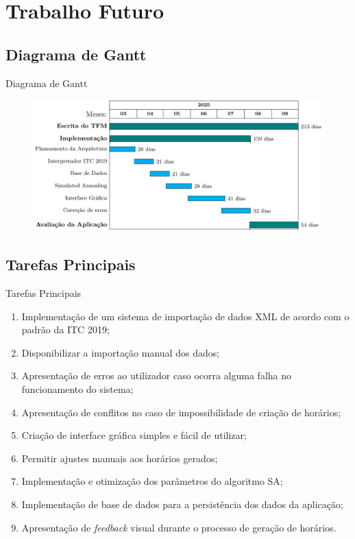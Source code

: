\documentclass[11]{beamer}
\begin{document}
    \section{Trabalho Futuro}

    \subsection{Diagrama de Gantt}

    \begin{frame}{Diagrama de Gantt}
        \justifying
        \begin{figure}
            \includegraphics[width=\linewidth]{img/Diagrama-Gantt.png}
        \end{figure}
    \end{frame}

    \subsection{Tarefas Principais}

    \begin{frame}{Tarefas Principais}
        \begin{enumerate}
            \item Implementação de um sistema de importação de dados XML de acordo com o padrão da ITC 2019;
            \item Disponibilizar a importação manual dos dados;
            \item Apresentação de erros ao utilizador caso ocorra alguma falha no funcionamento do sistema;
            \item Apresentação de conflitos no caso de impossibilidade de criação de horários;
            \item Criação de interface gráfica simples e fácil de utilizar;
            \item Permitir ajustes manuais aos horários gerados;
            \item Implementação e otimização dos parâmetros do algoritmo SA;
            \item Implementação de base de dados para a persistência dos dados da aplicação;
            \item Apresentação de \textit{feedback} visual durante o processo de geração de horários.
        \end{enumerate}
    \end{frame}
\end{document}
